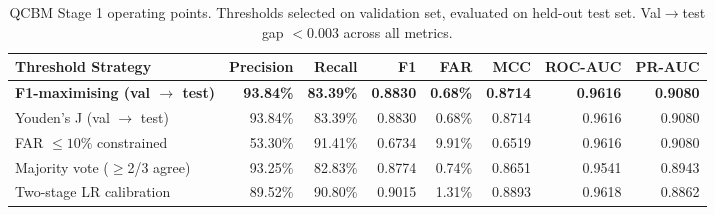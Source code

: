 \begin{table}[htbp]
\centering
\caption{QCBM Stage 1 operating points. Thresholds selected on validation set, evaluated on held-out test set. Val$\to$test gap $<0.003$ across all metrics.}
\label{tab:stage1_results}
\begin{tabular}{lrrrrrrr}
\toprule
\textbf{Threshold Strategy} & \textbf{Precision} & \textbf{Recall} & \textbf{F1} & \textbf{FAR} & \textbf{MCC} & \textbf{ROC-AUC} & \textbf{PR-AUC} \\
\midrule
\textbf{F1-maximising (val $\to$ test)} & \textbf{93.84\%} & \textbf{83.39\%} & \textbf{0.8830} & \textbf{0.68\%} & \textbf{0.8714} & \textbf{0.9616} & \textbf{0.9080} \\
Youden's J (val $\to$ test) & 93.84\% & 83.39\% & 0.8830 & 0.68\% & 0.8714 & 0.9616 & 0.9080 \\
FAR $\leq 10\%$ constrained & 53.30\% & 91.41\% & 0.6734 & 9.91\% & 0.6519 & 0.9616 & 0.9080 \\
Majority vote ($\geq$2/3 agree) & 93.25\% & 82.83\% & 0.8774 & 0.74\% & 0.8651 & 0.9541 & 0.8943 \\
Two-stage LR calibration & 89.52\% & 90.80\% & 0.9015 & 1.31\% & 0.8893 & 0.9618 & 0.8862 \\
\bottomrule
\end{tabular}
\end{table}